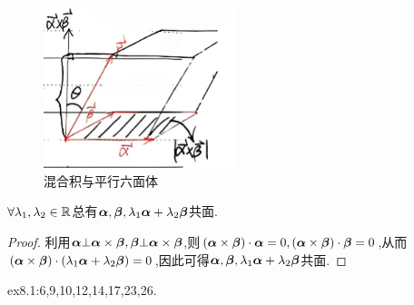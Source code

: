 \begin{figure}[h]
    \centering
    \includegraphics[width=0.5\textwidth]{figure/1-3混合积与平行六面体.png}
    \caption{混合积与平行六面体}
    \label{fig:fig3}
\end{figure}
\begin{example}
    $\forall \lambda_1,\lambda_2\in\mathbb{R}$总有$\bm{\alpha},\bm{\beta},\lambda_1\bm{\alpha}+\lambda_2\bm{\beta}$共面.
\end{example}
\begin{proof}
    利用$\bm{\alpha}\bot\bm{\alpha}\times\bm{\beta},\bm{\beta}\bot\bm{\alpha}\times\bm{\beta}$,则$(\bm{\alpha}\times\bm{\beta})\cdot\bm{\alpha}=0,(\bm{\alpha}\times\bm{\beta})\cdot\bm{\beta}=0$,从而$(\bm{\alpha}\times\bm{\beta})\cdot(\lambda_1\bm{\alpha}+\lambda_2\bm{\beta})=0$,因此可得$\bm{\alpha},\bm{\beta},\lambda_1\bm{\alpha}+\lambda_2\bm{\beta}$共面.
\end{proof}

\begin{homework} 
    ex8.1:6,9,10,12,14,17,23,26.
\end{homework}